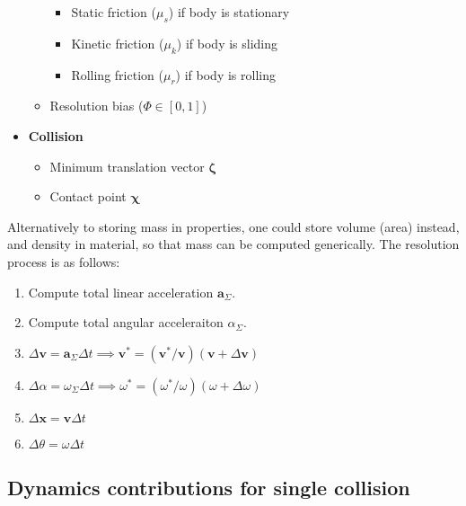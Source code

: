 \documentclass[10pt]{report}
\begin{document}
\begin{itemize}
\begin{itemize}
\begin{itemize}
\item Static friction ($\mu_s$) if body is stationary
\item Kinetic friction ($\mu_k$) if body is sliding
\item Rolling friction ($\mu_r$) if body is rolling
\end{itemize}
\item Resolution bias ($\Phi\in[0,1]$)
\end{itemize}
\item \textbf{Collision}
\begin{itemize}
\item Minimum translation vector $\boldsymbol{\zeta}$
\item Contact point $\boldsymbol{\chi}$
\end{itemize}
\end{itemize}
Alternatively to storing mass in properties, one could store volume (area) instead, and density in material, so that mass can be computed generically. The resolution process is as follows:
\begin{enumerate}
\item Compute total linear acceleration $\boldsymbol{a}_\Sigma$.
\item Compute total angular acceleraiton $\alpha_\Sigma$.
\item $\Delta\boldsymbol{v}=\boldsymbol{a}_\Sigma\Delta t\implies\boldsymbol{v}^*=(\boldsymbol{v}^*/\boldsymbol{v})(\boldsymbol{v}+\Delta\boldsymbol{v})$
\item $\Delta\alpha=\omega_\Sigma\Delta t\implies\omega^*=(\omega^*/\omega)(\omega+\Delta\omega)$
\item $\Delta\boldsymbol{x}=\boldsymbol{v}\Delta t$
\item $\Delta\theta=\omega\Delta t$
\end{enumerate}

\subsection{Dynamics contributions for single collision}
\end{document}
